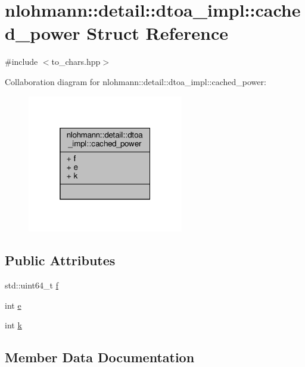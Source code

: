 \hypertarget{structnlohmann_1_1detail_1_1dtoa__impl_1_1cached__power}{}\section{nlohmann\+:\+:detail\+:\+:dtoa\+\_\+impl\+:\+:cached\+\_\+power Struct Reference}
\label{structnlohmann_1_1detail_1_1dtoa__impl_1_1cached__power}


{\ttfamily \#include $<$to\+\_\+chars.\+hpp$>$}



Collaboration diagram for nlohmann\+:\+:detail\+:\+:dtoa\+\_\+impl\+:\+:cached\+\_\+power\+:\nopagebreak
\begin{figure}[H]
\begin{center}
\leavevmode
\includegraphics[width=193pt]{structnlohmann_1_1detail_1_1dtoa__impl_1_1cached__power__coll__graph}
\end{center}
\end{figure}
\subsection*{Public Attributes}
\begin{DoxyCompactItemize}
\item 
std\+::uint64\+\_\+t \hyperlink{structnlohmann_1_1detail_1_1dtoa__impl_1_1cached__power_a21ae81f515f5b08d5bf423775ee56074}{f}
\item 
int \hyperlink{structnlohmann_1_1detail_1_1dtoa__impl_1_1cached__power_a9e89bc89bb7bf4361f43ea27eed91d23}{e}
\item 
int \hyperlink{structnlohmann_1_1detail_1_1dtoa__impl_1_1cached__power_a8c1f2efed643eeaa8fae83c697a29c6a}{k}
\end{DoxyCompactItemize}


\subsection{Member Data Documentation}
\mbox{\label{structnlohmann_1_1detail_1_1dtoa__impl_1_1cached__power_a9e89bc89bb7bf4361f43ea27eed91d23}} 

